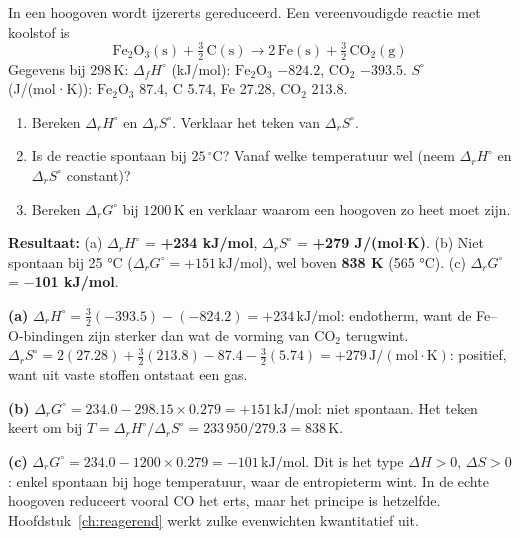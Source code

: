 \begin{oefening}
In een hoogoven wordt ijzererts gereduceerd. Een vereenvoudigde reactie met koolstof is
\[
\mathrm{Fe_2O_3(s) + \tfrac{3}{2}\,C(s) \longrightarrow 2\,Fe(s) + \tfrac{3}{2}\,CO_2(g)}
\]
Gegevens bij \(298\,\mathrm{K}\): \(\Delta_fH^\circ\) (kJ/mol): \(\mathrm{Fe_2O_3}\) \(-824.2\), \(\mathrm{CO_2}\) \(-393.5\). \(S^\circ\) (J/(mol·K)): \(\mathrm{Fe_2O_3}\) 87.4, C 5.74, Fe 27.28, \(\mathrm{CO_2}\) 213.8.

\begin{enumerate}
\item[(a)]
  Bereken \(\Delta_rH^\circ\) en \(\Delta_rS^\circ\). Verklaar het teken van \(\Delta_rS^\circ\).
\item[(b)]
  Is de reactie spontaan bij \(25\,^\circ\mathrm{C}\)? Vanaf welke temperatuur wel (neem \(\Delta_rH^\circ\) en \(\Delta_rS^\circ\) constant)?
\item[(c)]
  Bereken \(\Delta_rG^\circ\) bij \(1200\,\mathrm{K}\) en verklaar waarom een hoogoven zo heet moet zijn.
\end{enumerate}
\end{oefening}
\begin{oplossing}
\textbf{Resultaat:} (a) \(\Delta_rH^\circ\) = \textbf{+234 kJ/mol}, \(\Delta_rS^\circ\) = \textbf{+279 J/(mol\ensuremath{\cdot{}}K)}. (b) Niet spontaan bij 25 °C (\(\Delta_rG^\circ = +151\,\mathrm{kJ/mol}\)), wel boven \textbf{838 K} (565 °C). (c) \(\Delta_rG^\circ\) = \textbf{\ensuremath{-}101 kJ/mol}.

\textbf{(a)} \(\Delta_rH^\circ = \tfrac{3}{2}(-393.5) - (-824.2) = +234\,\mathrm{kJ/mol}\): endotherm, want de Fe--O-bindingen zijn sterker dan wat de vorming van \(\mathrm{CO_2}\) terugwint.
\(\Delta_rS^\circ = 2(27.28) + \tfrac{3}{2}(213.8) - 87.4 - \tfrac{3}{2}(5.74) = +279\,\mathrm{J/(mol\cdot K)}\): positief, want uit vaste stoffen ontstaat een gas.

\textbf{(b)} \(\Delta_rG^\circ = 234.0 - 298.15 \times 0.279 = +151\,\mathrm{kJ/mol}\): niet spontaan. Het teken keert om bij \(T = \Delta_rH^\circ/\Delta_rS^\circ = 233\,950/279.3 = 838\,\mathrm{K}\).

\textbf{(c)} \(\Delta_rG^\circ = 234.0 - 1200 \times 0.279 = -101\,\mathrm{kJ/mol}\). Dit is het type \(\Delta H > 0\), \(\Delta S > 0\): enkel spontaan bij hoge temperatuur, waar de entropieterm wint. In de echte hoogoven reduceert vooral CO het erts, maar het principe is hetzelfde. Hoofdstuk~\ref{ch:reagerend} werkt zulke evenwichten kwantitatief uit.
\end{oplossing}

